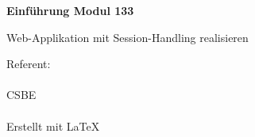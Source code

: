 
\thispagestyle{empty}
\begin{titlepage}
    \begin{center}
        \vspace*{2.5cm}

        \Huge
        \textbf{Einführung Modul 133}

        \vspace{0.5cm}
        \LARGE
        Web-Applikation mit Session-Handling realisieren

        \vfill


        \vspace{0.8cm}

        \Large
        Referent: \gitAuthorName\\
        \gitAuthorEmail\\
        CSBE\\
        \gitAuthorDate\\
        \small
        \vspace{1cm}
        Erstellt mit \LaTeX\\
        \vspace{1cm}
        \gitStyler
    \end{center}
\end{titlepage}